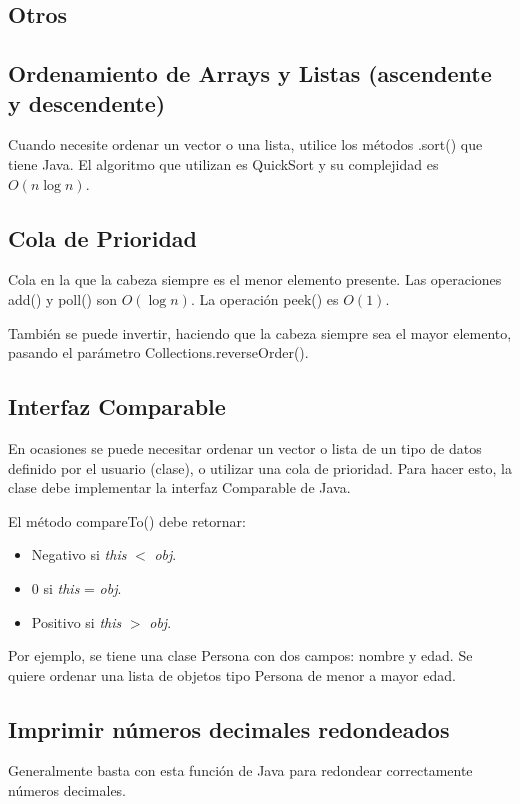 \documentclass{article}
\begin{document}
\begin{multicols}{2}
\section{Otros}
	\subsection{Ordenamiento de Arrays y Listas (ascendente y descendente)}
	Cuando necesite ordenar un vector o una lista, utilice los métodos .sort() que tiene 		Java. El algoritmo que utilizan es QuickSort y su complejidad es \( O(n\log n) \).
	
	
	\subsection{Cola de Prioridad}
	Cola en la que la cabeza siempre es el menor elemento presente. Las operaciones add() y poll() son \( O(\log n ) \). La operación peek() es \( O(1) \).
	
	También se puede invertir, haciendo que la cabeza siempre sea el mayor elemento, pasando el parámetro Collections.reverseOrder().
	
	
	\subsection{Interfaz Comparable}
	En ocasiones se puede necesitar ordenar un vector o lista de un tipo de datos definido por el usuario (clase), o utilizar una cola de prioridad. Para hacer esto, la clase debe implementar la interfaz Comparable de Java.

	El método compareTo() debe retornar:
	\begin{itemize}
		\item Negativo si \emph{this} \( < \) \emph{obj}.
		\item 0 si \emph{this} = \emph{obj}.
		\item Positivo si \emph{this} \( > \) \emph{obj}.
	\end{itemize}	
	
	Por ejemplo, se tiene una clase Persona con dos campos: nombre y edad. Se quiere ordenar una lista de objetos tipo Persona de menor a mayor edad.
	
	
	\subsection{Imprimir números decimales redondeados}
	Generalmente basta con esta función de Java para redondear correctamente números decimales.	
	
	

\end{multicols}
\end{document}
